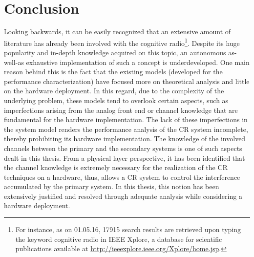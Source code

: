 \chapter{Conclusion}
\label{chap:Con}

Looking backwards, it can be easily recognized that an extensive amount of literature has already been involved with the cognitive radio\footnote{For instance, as on 01.05.16, 17915 search results are retrieved upon typing the keyword cognitive radio in IEEE Xplore, a database for scientific publications available at \url{http://ieeexplore.ieee.org/Xplore/home.jsp}.}. Despite its huge popularity and in-depth knowledge acquired on this topic, an autonomous as-well-as exhaustive implementation of such a concept is underdeveloped. One main reason behind this is the fact that the existing models (developed for the performance characterization) have focused more on theoretical analysis and little on the hardware deployment. In this regard, due to the complexity of the underlying problem, these models tend to overlook certain aspects, such as imperfections arising from the analog front end or channel knowledge that are fundamental for the hardware implementation. The lack of these imperfections in the system model renders the performance analysis of the CR system incomplete, thereby prohibiting its hardware implementation. The knowledge of the involved channels between the primary and the secondary systems is one of such aspects dealt in this thesis. 
From a physical layer perspective, it has been identified that the channel knowledge is extremely necessary for the realization of the CR techniques on a hardware, thus, allows a CR system to control the interference accumulated by the primary system. In this thesis, this notion has been extensively justified and resolved through adequate analysis while considering a hardware deployment. %

